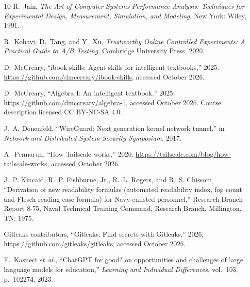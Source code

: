 \documentclass[11pt]{article}
\begin{document}
\begin{thebibliography}{10}
R.~Jain, {\em The Art of Computer Systems Performance Analysis: Techniques for
  Experimental Design, Measurement, Simulation, and Modeling}.
\newblock New York: Wiley, 1991.

R.~Kohavi, D.~Tang, and Y.~Xu, {\em Trustworthy Online Controlled Experiments:
  A Practical Guide to {A/B} Testing}.
\newblock Cambridge University Press, 2020.

D.~McCreary, ``{ibook-skills}: Agent skills for intelligent textbooks,'' 2025.
\newblock \url{https://github.com/dmccreary/ibook-skills}, accessed October
  2026.

D.~McCreary, ``Algebra {I}: An intelligent textbook,'' 2025.
\newblock \url{https://github.com/dmccreary/algebra-1}, accessed October 2026.
  Course description licensed {CC BY-NC-SA 4.0}.

J.~A. Donenfeld, ``{WireGuard}: Next generation kernel network tunnel,'' in
  {\em Network and Distributed System Security Symposium}, 2017.

A.~Pennarun, ``How {Tailscale} works,'' 2020.
\newblock \url{https://tailscale.com/blog/how-tailscale-works}, accessed
  October 2026.

J.~P. Kincaid, R.~P. Fishburne, Jr., R.~L. Rogers, and B.~S. Chissom,
  ``Derivation of new readability formulas (automated readability index, fog
  count and {Flesch} reading ease formula) for {Navy} enlisted personnel,''
  Research Branch Report 8-75, Naval Technical Training Command, Research
  Branch, Millington, TN, 1975.

{Gitleaks contributors}, ``Gitleaks: Find secrets with {Gitleaks},'' 2026.
\newblock \url{https://github.com/gitleaks/gitleaks}, accessed October 2026.

E.~Kasneci {\em et~al.}, ``{ChatGPT} for good? on opportunities and challenges
  of large language models for education,'' {\em Learning and Individual
  Differences}, vol.~103, p.~102274, 2023.

\end{thebibliography}
\end{document}
